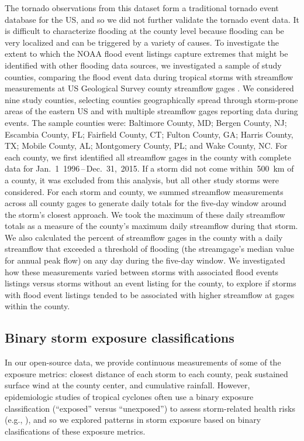 The tornado observations from this dataset form a traditional tornado event
database for the \ac{US}, and so we did not further validate
the tornado event data. It is difficult to characterize flooding at the county
level because flooding can be very localized and can be triggered by a variety
of causes. To investigate the extent to which the NOAA flood event listings
capture extremes that might be identified with other flooding data sources, we
investigated a sample of study counties, comparing the flood event data during
tropical storms with streamflow measurements at \ac{US} Geological Survey
county streamflow gages \parencite{usgsgages, countyfloods, dataRetrieval}.  
We considered nine study counties, selecting counties geographically spread
through storm-prone areas of the eastern \ac{US} and with multiple streamflow
gages reporting data during events. The sample counties were: Baltimore County,
MD; Bergen County, NJ; Escambia County, FL; Fairfield County, CT; Fulton
County, GA; Harris County, TX; Mobile County, AL; Montgomery County, PL; and
Wake County, NC. For each county, we first identified all streamflow gages in
the county with complete data for Jan.~1~1996\,--\,Dec.~31,~2015. If a storm
did not come within~500~\si{\kilo\metre} of a county, it was excluded from this
analysis, but all other study storms were considered. 
For each storm and county, we summed streamflow measurements across all county
gages to generate daily totals for the five-day window around the storm's
closest approach. We took the maximum of these daily streamflow totals as a
measure of the county's maximum daily streamflow during that storm. We also
calculated the percent of streamflow gages in the county with a daily
streamflow that exceeded a threshold of flooding (the streamgage's median value
for annual peak flow) on any day during the five-day
window. We investigated how these measurements varied between storms with
associated flood events listings versus storms without an
event listing for the county, to explore if storms with flood event listings
tended to be associated with higher streamflow at gages within the county.

\subsection*{Binary storm exposure classifications}

In our open-source data, we provide continuous measurements of some of the
exposure metrics: closest distance of each storm to each county, peak sustained
surface wind at the county center, and cumulative rainfall. However,
epidemiologic studies of tropical cyclones often use a binary exposure
classification (``exposed'' versus ``unexposed'') to assess storm-related
health risks (e.g., \textcite{grabich2015, mckinney2011,
caillouet2008increase}), and so we explored patterns in storm exposure based on
binary clasifications of these exposure metrics. 


